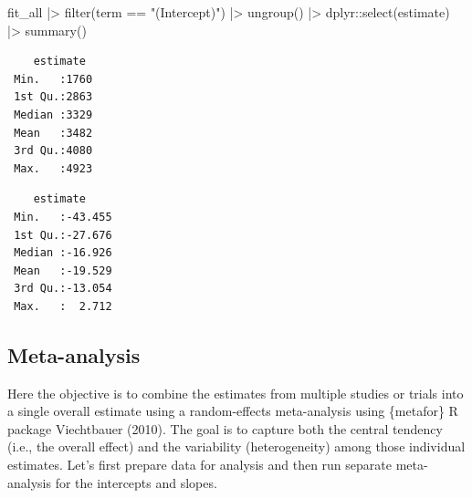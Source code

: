 \documentclass[
  letterpaper,
]{book}
\newenvironment{Shaded}{\begin{snugshade}}{\end{snugshade}}
\newcommand{\FunctionTok}[1]{\textcolor[rgb]{0.28,0.35,0.67}{#1}}
\newcommand{\NormalTok}[1]{\textcolor[rgb]{0.00,0.23,0.31}{#1}}
\newcommand{\SpecialCharTok}[1]{\textcolor[rgb]{0.37,0.37,0.37}{#1}}
\newcommand{\StringTok}[1]{\textcolor[rgb]{0.13,0.47,0.30}{#1}}
\begin{document}
\begin{Shaded}
\begin{Highlighting}[]
\NormalTok{fit\_all }\SpecialCharTok{|\textgreater{}} 
  \FunctionTok{filter}\NormalTok{(term }\SpecialCharTok{==} \StringTok{"(Intercept)"}\NormalTok{) }\SpecialCharTok{|\textgreater{}}
  \FunctionTok{ungroup}\NormalTok{() }\SpecialCharTok{|\textgreater{}} 
\NormalTok{  dplyr}\SpecialCharTok{::}\FunctionTok{select}\NormalTok{(estimate) }\SpecialCharTok{|\textgreater{}} 
  \FunctionTok{summary}\NormalTok{()}
\end{Highlighting}
\end{Shaded}

\begin{verbatim}
    estimate   
 Min.   :1760  
 1st Qu.:2863  
 Median :3329  
 Mean   :3482  
 3rd Qu.:4080  
 Max.   :4923  
\end{verbatim}

\begin{Shaded}
\end{Shaded}

\begin{verbatim}
    estimate      
 Min.   :-43.455  
 1st Qu.:-27.676  
 Median :-16.926  
 Mean   :-19.529  
 3rd Qu.:-13.054  
 Max.   :  2.712  
\end{verbatim}

\hypertarget{meta-analysis}{%
\subsection{Meta-analysis}\label{meta-analysis}}

Here the objective is to combine the estimates from multiple studies or
trials into a single overall estimate using a random-effects
meta-analysis using \{metafor\} R package Viechtbauer (2010). The goal
is to capture both the central tendency (i.e., the overall effect) and
the variability (heterogeneity) among those individual estimates. Let's
first prepare data for analysis and then run separate meta-analysis for
the intercepts and slopes.
\end{document}
